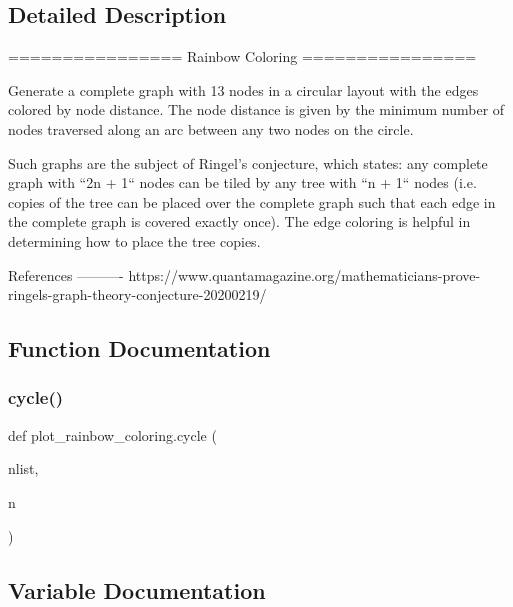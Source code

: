 \subsection{Detailed Description}
\begin{DoxyVerb}================
Rainbow Coloring
================

Generate a complete graph with 13 nodes in a circular layout with the
edges colored by node distance. The node distance is given by the minimum
number of nodes traversed along an arc between any two nodes on the circle.

Such graphs are the subject of Ringel's conjecture, which states: any complete
graph with ``2n + 1`` nodes can be tiled by any tree with ``n + 1`` nodes
(i.e. copies of the tree can be placed over the complete graph such that each
edge in the complete graph is covered exactly once). The edge coloring is
helpful in determining how to place the tree copies.

References
----------
https://www.quantamagazine.org/mathematicians-prove-ringels-graph-theory-conjecture-20200219/
\end{DoxyVerb}
 

\subsection{Function Documentation}
\mbox{\label{namespaceplot__rainbow__coloring_af1d4a9b6e692c5c7c243e7abece6a75f}} 
\subsubsection{\texorpdfstring{cycle()}{cycle()}}
{\footnotesize\ttfamily def plot\+\_\+rainbow\+\_\+coloring.\+cycle (\begin{DoxyParamCaption}\item[{}]{nlist,  }\item[{}]{n }\end{DoxyParamCaption})}



\subsection{Variable Documentation}
\mbox{\label{namespaceplot__rainbow__coloring_aaae8a744ac5c90e6b46a1ab9df4750cb}} 
